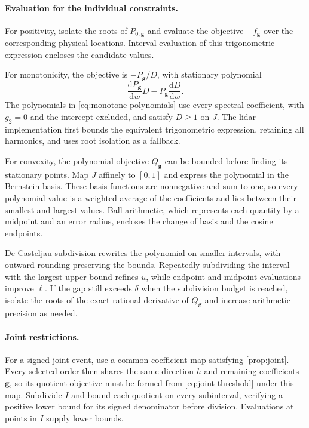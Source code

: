 \paragraph{Evaluation for the individual constraints.}
For positivity, isolate the roots of $P_{0,\boldsymbol g}$ and
evaluate the objective $-f_{\boldsymbol g}$ over the corresponding
physical locations. Interval evaluation of this trigonometric
expression encloses the candidate values.

For monotonicity, the objective is $-P_{\boldsymbol g}/D$, with
stationary polynomial
\[
 \frac{\mathrm{d}P_{\boldsymbol g}}{\mathrm{d}w}D
 -P_{\boldsymbol g}\frac{\mathrm{d}D}{\mathrm{d}w}.
\]
The polynomials in \cref{eq:monotone-polynomials} use every spectral
coefficient, with $g_2=0$ and the intercept excluded, and satisfy
$D\geq1$ on $J$. The lidar implementation first bounds the equivalent
trigonometric expression, retaining all harmonics, and uses root
isolation as a fallback.

For convexity, the polynomial objective $Q_{\boldsymbol g}$ can be
bounded before finding its stationary points. Map $J$ affinely to
$[0,1]$ and express the polynomial in the Bernstein basis. These
basis functions are nonnegative and sum to one, so every polynomial
value is a weighted average of the coefficients and lies between
their smallest and largest values. Ball arithmetic, which represents
each quantity by a midpoint and an error radius, encloses the change
of basis and the cosine endpoints.

De Casteljau subdivision rewrites the polynomial on smaller
intervals, with outward rounding preserving the bounds. Repeatedly
subdividing the interval with the largest upper bound refines $u$,
while endpoint and midpoint evaluations improve $\ell$.
If the gap still exceeds $\delta$ when the subdivision budget is
reached, isolate the roots of the exact rational derivative of
$Q_{\boldsymbol g}$ and increase arithmetic precision as needed.

\paragraph{Joint restrictions.}
For a signed joint event, use a common coefficient map satisfying
\cref{prop:joint}. Every selected order then shares the same direction
$h$ and remaining coefficients $\boldsymbol g$, so its quotient
objective must be formed from \cref{eq:joint-threshold} under this map.
Subdivide $I$ and bound each quotient on every subinterval, verifying
a positive lower bound for its signed denominator before division.
Evaluations at points in $I$ supply lower bounds.

